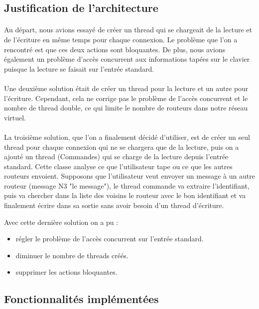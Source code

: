 \subsection{Justification de l'architecture}
	\paragraph{}Au départ, nous avions essayé de créer un thread qui se chargeait de la
	lecture et de l'écriture en même temps pour chaque connexion. Le
	problème que l'on a rencontré est que ces deux actions sont bloquantes. De plus, nous avions également un problème d'accès concurrent aux informations
	tapées sur le clavier puisque la lecture se faisait sur l'entrée
	standard.

	\paragraph{}Une deuxième solution était de créer un thread pour la lecture
	et un autre pour l'écriture. Cependant, cela ne corrige pas le
	problème de l'accès concurrent et le nombre de thread double, ce qui
	limite le nombre de routeurs dans notre réseau virtuel.

	\paragraph{}La troisième solution, que l'on a finalement décidé d'utiliser, 
	est de créer un seul thread pour chaque connexion qui ne se chargera
	que de la lecture, puis on a ajouté un thread (Commandes) qui se charge
	de la lecture depuis l'entrée standard. Cette classe analyse ce que
	l'utilisateur tape ou ce que les autres routeurs envoient. Supposons
	que l'utilisateur veut envoyer un message à un autre routeur (message
	N3 "le message"), le thread commande va extraire l'identifiant, puis
	va chercher dans la liste des voisins le routeur avec le bon
	identifiant et va finalement écrire dans sa sortie sans avoir besoin
	d'un thread d'écriture.

	    Avec cette dernière solution on a pu :
\begin{itemize}
\item régler le problème de l'accès concurrent sur l'entrée standard.
\item diminuer le nombre de threads créés.
\item supprimer les actions bloquantes.
\end{itemize}

\subsection{Fonctionnalités implémentées}

